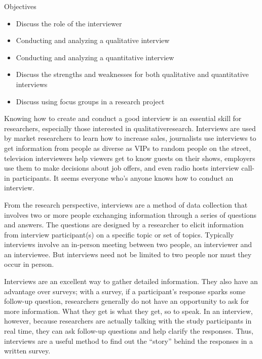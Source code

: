 \begin{center}
	\begin{objbox}{Objectives}
		\begin{itemize}
			\setlength{\itemsep}{0pt}
			\setlength{\parskip}{0pt}
			\setlength{\parsep}{0pt}
			
			\item Discuss the role of the interviewer
			\item Conducting and analyzing a qualitative interview
			\item Conducting and analyzing a quantitative interview
			\item Discuss the strengths and weaknesses for both qualitative and quantitative interviews
			\item Discuss using focus groups in a research project

		\end{itemize}
	\end{objbox}
\end{center}

Knowing how to create and conduct a good interview is an essential skill for researchers, especially those interested in \gls{qualitativeresearch}. Interviews are used by market researchers to learn how to increase sales, journalists use interviews to get information from people as diverse as VIPs to random people on the street, television interviewers help viewers get to know guests on their shows, employers use them to make decisions about job offers, and even radio hosts interview call-in participants. It seems everyone who's anyone knows how to conduct an interview.

From the research perspective, interviews are a method of data collection that involves two or more people exchanging information through a series of questions and answers. The questions are designed by a researcher to elicit information from interview participant(s) on a specific topic or set of topics. Typically interviews involve an in-person meeting between two people, an interviewer and an interviewee. But interviews need not be limited to two people nor must they occur in person.

Interviews are an excellent way to gather detailed information. They also have an advantage over surveys; with a survey, if a participant's response sparks some follow-up question, researchers generally do not have an opportunity to ask for more information. What they get is what they get, so to speak. In an interview, however, because researchers are actually talking with the study participants in real time, they can ask follow-up questions and help clarify the responses. Thus, interviews are a useful method to find out the ``story'' behind the responses in a written survey.

